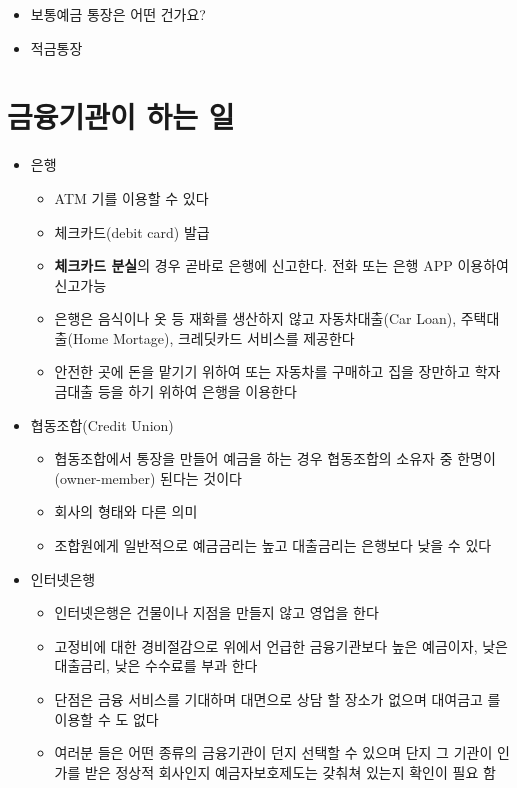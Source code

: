 \documentclass[
]{book}
\providecommand{\tightlist}{%
  \setlength{\itemsep}{0pt}\setlength{\parskip}{0pt}}
\begin{document}
\begin{itemize}
\tightlist
\item
  보통예금 통장은 어떤 건가요?
\item
  적금통장
\end{itemize}

\hypertarget{uxae08uxc735uxae30uxad00uxc774-uxd558uxb294-uxc77c}{%
\section{금융기관이 하는 일}\label{uxae08uxc735uxae30uxad00uxc774-uxd558uxb294-uxc77c}}

\begin{itemize}
\tightlist
\item
  은행

  \begin{itemize}
  \tightlist
  \item
    ATM 기를 이용할 수 있다
  \item
    체크카드(debit card) 발급
  \item
    \textbf{체크카드 분실}의 경우 곧바로 은행에 신고한다. 전화 또는 은행 APP 이용하여 신고가능
  \item
    은행은 음식이나 옷 등 재화를 생산하지 않고 자동차대출(Car Loan), 주택대출(Home Mortage), 크레딧카드 서비스를 제공한다
  \item
    안전한 곳에 돈을 맡기기 위하여 또는 자동차를 구매하고 집을 장만하고 학자금대출 등을 하기 위하여 은행을 이용한다
    \\
  \end{itemize}
\item
  협동조합(Credit Union)

  \begin{itemize}
  \tightlist
  \item
    협동조합에서 통장을 만들어 예금을 하는 경우 협동조합의 소유자 중 한명이(owner-member) 된다는 것이다
  \item
    회사의 형태와 다른 의미
  \item
    조합원에게 일반적으로 예금금리는 높고 대출금리는 은행보다 낮을 수 있다
    \\
  \end{itemize}
\item
  인터넷은행

  \begin{itemize}
  \tightlist
  \item
    인터넷은행은 건물이나 지점을 만들지 않고 영업을 한다
  \item
    고정비에 대한 경비절감으로 위에서 언급한 금융기관보다 높은 예금이자, 낮은대출금리, 낮은 수수료를 부과 한다\\
  \item
    단점은 금융 서비스를 기대하며 대면으로 상담 할 장소가 없으며 대여금고 를 이용할 수 도 없다
  \item
    여러분 들은 어떤 종류의 금융기관이 던지 선택할 수 있으며 단지 그 기관이 인가를 받은 정상적 회사인지 예금자보호제도는 갖춰쳐 있는지 확인이 필요 함
  \end{itemize}
\end{itemize}
\end{document}
